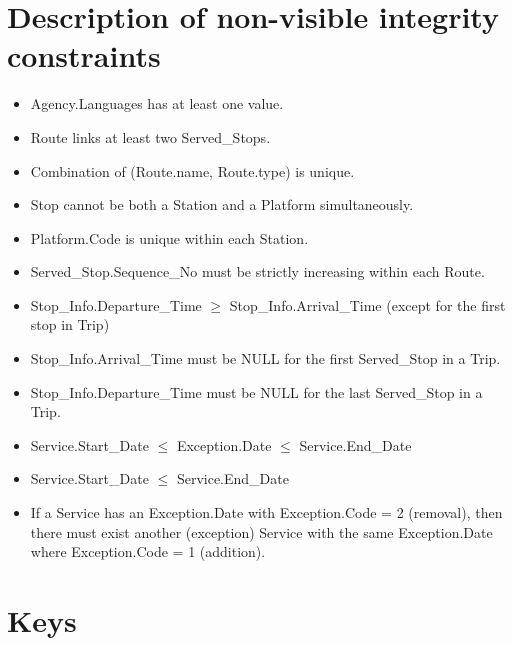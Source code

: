 \documentclass[a4paper, 12pt]{article}
\begin{document}
\section{Description of non-visible integrity constraints} \label{sec:3}
\begin{itemize}
    \item Agency.Languages has at least one value.
    
    \item Route links at least two Served\_Stops.
    \item Combination of (Route.name, Route.type) is unique.

    \item Stop cannot be both a Station and a Platform simultaneously.
    \item Platform.Code is unique within each Station.

    \item Served\_Stop.Sequence\_No must be strictly increasing within each Route.


    \item Stop\_Info.Departure\_Time $\geq$ Stop\_Info.Arrival\_Time (except for the first stop in Trip)
    \item Stop\_Info.Arrival\_Time must be NULL for the first Served\_Stop in a Trip.
    \item Stop\_Info.Departure\_Time must be NULL for the last Served\_Stop in a Trip.
    
    \item Service.Start\_Date $\leq$ Exception.Date $\leq$ Service.End\_Date
    \item Service.Start\_Date $\leq$ Service.End\_Date
    \item If a Service has an Exception.Date with Exception.Code = 2 (removal), then there must exist another (exception) Service with the same Exception.Date where Exception.Code = 1 (addition). %
\end{itemize}

\section{Keys} \label{sec:4}
\end{document}
